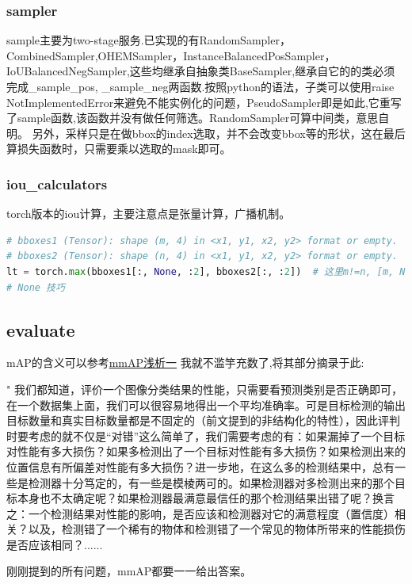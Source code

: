 \documentclass[UTF8]{ctexart}
\begin{document}
\subsubsection{sampler}
sample主要为two-stage服务.已实现的有RandomSampler，CombinedSampler,OHEMSampler，InstanceBalancedPosSampler，IoUBalancedNegSampler,这些均继承自抽象类BaseSampler,继承自它的的类必须完成\_sample\_pos,
\_sample\_neg两函数.按照python的语法，子类可以使用raise　NotImplementedError来避免不能实例化的问题，PseudoSampler即是如此,它重写了sample函数,该函数并没有做任何筛选。RandomSampler可算中间类，意思自明。
另外，采样只是在做bbox的index选取，并不会改变bbox等的形状，这在最后算损失函数时，只需要乘以选取的mask即可。

\subsubsection{iou\_calculators}
torch版本的iou计算，主要注意点是张量计算，广播机制。

\lstset{style=mystyle}
\begin{lstlisting}[language=Python]
# bboxes1 (Tensor): shape (m, 4) in <x1, y1, x2, y2> format or empty.
# bboxes2 (Tensor): shape (n, 4) in <x1, y1, x2, y2> format or empty.
lt = torch.max(bboxes1[:, None, :2], bboxes2[:, :2])  # 这里m!=n, [m, None, 2] + [n, 2] --> [m, n, 2] 
# None 技巧
\end{lstlisting}

\subsection{evaluate}
mAP的含义可以参考\href{https://zhuanlan.zhihu.com/p/55575423}{mmAP浅析一}
我就不滥竽充数了,将其部分摘录于此:

"
我们都知道，评价一个图像分类结果的性能，只需要看预测类别是否正确即可，在一个数据集上面，我们可以很容易地得出一个平均准确率。可是目标检测的输出目标数量和真实目标数量都是不固定的（前文提到的非结构化的特性），因此评判时要考虑的就不仅是“对错”这么简单了，我们需要考虑的有：如果漏掉了一个目标对性能有多大损伤？如果多检测出了一个目标对性能有多大损伤？如果检测出来的位置信息有所偏差对性能有多大损伤？进一步地，在这么多的检测结果中，总有一些是检测器十分笃定的，有一些是模棱两可的。如果检测器对多检测出来的那个目标本身也不太确定呢？如果检测器最满意最信任的那个检测结果出错了呢？换言之：一个检测结果对性能的影响，是否应该和检测器对它的满意程度（置信度）相关？以及，检测错了一个稀有的物体和检测错了一个常见的物体所带来的性能损伤是否应该相同？......

刚刚提到的所有问题，mmAP都要一一给出答案。
\end{document}
